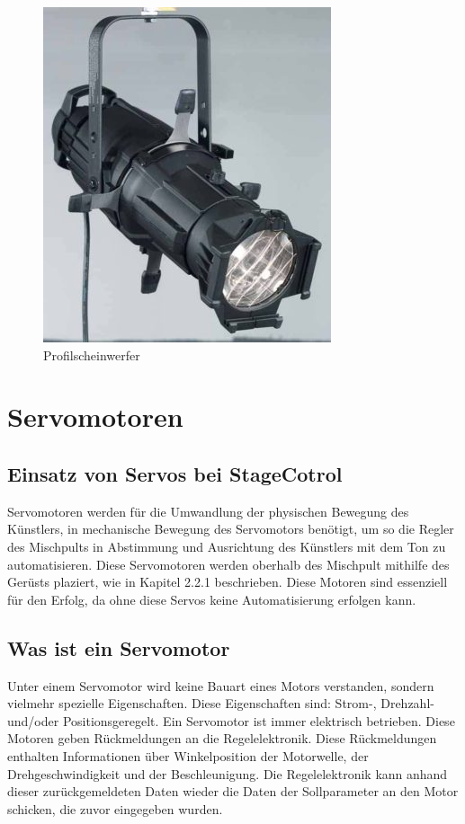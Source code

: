 \begin{figure}[H]
	\centering
	\includegraphics[width=0.7\linewidth]{images/Profilscheinwerfer.jpg}
	\caption[Profilscheinwerfer]{Profilscheinwerfer}
	\label{fig:Profilscheinwerfer}
\end{figure}

\section{Servomotoren}
\subsection{Einsatz von Servos bei StageCotrol}
Servomotoren werden für die Umwandlung der physischen Bewegung des Künstlers, in mechanische Bewegung des Servomotors benötigt, um so die Regler des Mischpults in Abstimmung und Ausrichtung des Künstlers mit dem Ton zu automatisieren. Diese Servomotoren werden oberhalb des Mischpult mithilfe des Gerüsts plaziert, wie in Kapitel 2.2.1 beschrieben. Diese Motoren sind essenziell für den Erfolg, da ohne diese Servos keine Automatisierung erfolgen kann.

\subsection{Was ist ein Servomotor}
Unter einem Servomotor wird keine Bauart eines Motors verstanden, sondern vielmehr spezielle Eigenschaften. Diese Eigenschaften sind: Strom-, Drehzahl- und/oder Positionsgeregelt. Ein Servomotor ist immer elektrisch betrieben. Diese Motoren geben Rückmeldungen an die Regelelektronik. Diese Rückmeldungen enthalten Informationen über Winkelposition der Motorwelle, der Drehgeschwindigkeit und der Beschleunigung. Die Regelelektronik kann anhand dieser zurückgemeldeten Daten wieder die Daten der Sollparameter an den Motor schicken, die zuvor eingegeben wurden. \\
\cite{Servomotor_Info}


